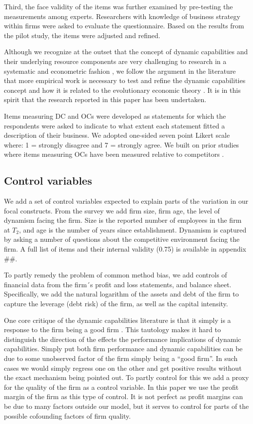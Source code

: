 \documentclass[review,fleqn]{elsarticle}\usepackage[]{graphicx}\usepackage[]{color}
\begin{document}
Third, the face validity of the items was further examined by pre-testing the measurements
among experts. Researchers with knowledge of business strategy within firms were asked to
evaluate the questionnaire. Based on the results from the pilot study, the items were
adjusted and refined.

Although we recognize at the outset that the concept of dynamic capabilities and their
underlying resource components are very challenging to research in a systematic and
econometric fashion \citep{McKelvie2009}, we follow the argument in the
literature that more empirical work is necessary to test and refine the dynamic
capabilities concept and how it is related to the evolutionary economic theory
\citep{Arend2009,McKelvie2009} .  It
is in this spirit that the research reported in this paper has been undertaken.

Items measuring DC and OCs were developed as statements for which the respondents were
asked to indicate to what extent each statement fitted a description of their business. We
adopted one-sided seven point Likert scale where: 1 = strongly disagree and 7 = strongly
agree. We built on prior studies where items measuring OCs have been measured relative to
competitors \citep{McKelvie2009}.


\subsection{Control variables}

We add a set of control variables expected to explain parts of the variation in our focal
constructs. From the survey we add firm size, firm age, the level of dynamism facing the
firm. Size is the reported number of employees in the firm at $T_2$, and age is the number of
years since establishment. Dynamism is captured by asking a number of questions about the
competitive environment facing the firm. A full list of items and their internal validity
(0.75) is available in appendix ##.

To partly remedy the problem of common method bias, we add controls of financial data from
the firm´s profit and loss statements, and balance sheet. Specifically, we add the natural
logarithm of the assets and debt of the firm to capture the leverage (debt risk) of the
firm, as well as the capital intensity.

One core critique of the dynamic capabilities literature is that it simply is a response
to the firm being a good firm \citep{Arend2009}. This tautology makes it hard to
distinguish the direction of the effects the performance implications of dynamic
capabilities. Simply put both firm performance and dynamic capabilities can be due to some
unobserved factor of the firm simply being a “good firm”. In such cases we would simply
regress one on the other and get positive results without the exact mechanism being
pointed out. To partly control for this we add a proxy for the quality of the firm as a
control variable. In this paper we use the profit margin of the firm as this type of
control. It is not perfect as profit margins can be due to many factors outside our model,
but it serves to control for parts of the possible cofounding factors of firm quality.
\end{document}
